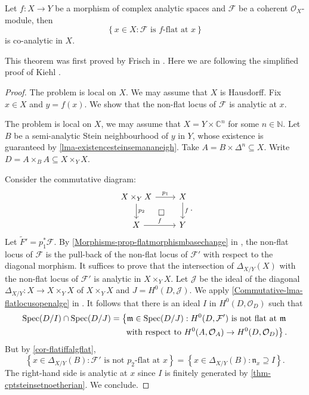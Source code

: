 \begin{thm}
    Let $f:X\rightarrow Y$ be a morphism of complex analytic spaces and $\mathcal{F}$ be a coherent $\mathcal{O}_X$-module, then
    \[
        \left\{ x\in X: \mathcal{F}\text{ is }f\text{-flat at }x   \right\}
    \]  
    is co-analytic in $X$.
\end{thm}
This theorem was first proved by Frisch in \cite{Fri67}. Here we are following the simplified proof of Kiehl \cite{Kie67}.
\begin{proof}
    The problem is local on $X$. We may assume that $X$ is Hausdorff.
    Fix $x\in X$ and $y=f(x)$. We show that the non-flat locus of $\mathcal{F}$ is analytic at $x$. 

    The problem is local on $X$, we may assume that $X=Y\times \mathbb{C}^n$ for some $n\in \mathbb{N}$.
    Let $B$ be a semi-analytic Stein neighbourhood of $y$ in $Y$, whose existence is guaranteed by \cref{lma-existencesteinsemananeigh}. Take $A=B\times \Delta^n\subseteq X$. Write $D=A\times_B A\subseteq X\times_Y X$.

    Consider the commutative diagram:
    \[
        \begin{tikzcd}
            X\times_Y X \arrow[r,"p_1"] \arrow[d,"p_2"] \arrow[rd, "\square", phantom] & X \arrow[d, "f"] \\
            X \arrow[r, "f"]                                               & Y               
        \end{tikzcd}.    
    \]
    Let $\tilde{F}'=p_1^*\mathcal{F}$.
    By \cref{Morphisms-prop-flatmorphismbasechange}  in , the non-flat locus of $\mathcal{F}$ is the pull-back of the non-flat locus of $\mathcal{F}'$ with respect to the diagonal morphism. It suffices to prove that the intersection of $\Delta_{X/Y}(X)$ with the non-flat locus of $\mathcal{F}'$ is analytic in $X\times_Y X$. Let $\mathcal{J}$ be the ideal of the diagonal $\Delta_{X/Y}:X\rightarrow X\times_Y X$ of $X\times_Y X$ and $J=H^0(D,\mathcal{J})$. We apply \cref{Commutative-lma-flatlocusopenalge} in . It follows that there is an ideal $I$ in $H^0(D,\mathcal{O}_D)$ such that
    \[
        \begin{split}
        \operatorname{Spec} (D/I)\cap \operatorname{Spec} (D/J)=\left\{\mathfrak{m}\in \operatorname{Spec} (D/J): H^0(D,\mathcal{F}')\text{ is not flat at }\mathfrak{m}\right.\\
        \left.\text{ with respect to } H^0(A,\mathcal{O}_A)\rightarrow H^0(D,\mathcal{O}_D) \right\}.  
        \end{split}
    \]
    But by \cref{cor-flatiffalgflat},
    \[
        \left\{x\in \Delta_{X/Y}(B): \mathcal{F}'\text{ is not } p_2\text{-flat at }x  \right\}=\left\{ x\in \Delta_{X/Y}(B): \mathfrak{n}_x\supseteq I\right\}.  
    \]
    The right-hand side is analytic at $x$ since $I$ is finitely generated by \cref{thm-cptsteinsetnoetherian}.
    We conclude.
\end{proof}

\printbibliography
